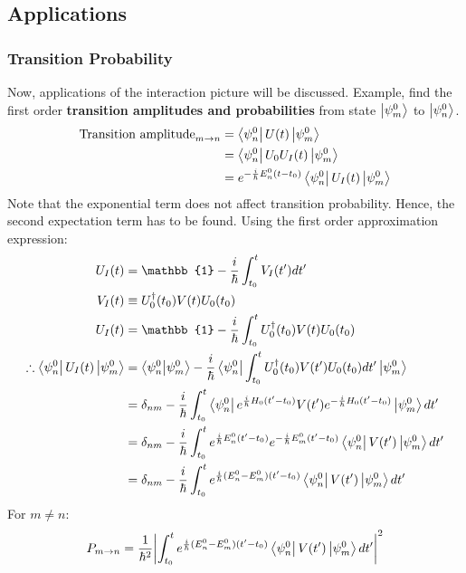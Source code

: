 \documentclass{article}
\begin{document}
\begin{flushleft}
\subsection{Applications}
\subsubsection{Transition Probability}
Now, applications of the interaction picture will be discussed. Example, find the first order \textbf{transition amplitudes and probabilities} from state $\ket{\psi_m^0}$ to $\ket{\psi_n^0}$.
\begin{align*}
    \text{Transition amplitude}_{m\rightarrow n}&=\bra{\psi_n^0}U(t)\ket{\psi_m^0}\\
    &=\bra{\psi_n^0}U_0U_I(t)\ket{\psi_m^0}\\
    &=e^{-\frac{i}{\hbar}E_n^0(t-t_0)}\bra{\psi_n^0}U_I(t)\ket{\psi_m^0}\\
    \end{align*}
Note that the exponential term does not affect transition probability. Hence, the second expectation term has to be found. Using the first order approximation expression:
\begin{align*}
     U_I(t)&=\mathbb{1}-\frac{i}{\hbar}\int_{t_0}^{t}V_I(t')dt'\\
     V_I(t)&\equiv U_0^\dagger(t_0) V(t)U_0(t_0)\\
     U_I(t)&=\mathbb{1}-\frac{i}{\hbar}\int_{t_0}^{t}U_0^\dagger(t_0) V(t)U_0(t_0)\\
     \therefore \bra{\psi_n^0}U_I(t)\ket{\psi_m^0}&=\bra{\psi_n^0}\ket{\psi_m^0}-\frac{i}{\hbar}\bra{\psi_n^0}\int_{t_0}^{t}U_0^\dagger(t_0) V(t')U_0(t_0)dt'\ket{\psi_m^0}\\
     &=\delta_{nm}-\frac{i}{\hbar}\int_{t_0}^{t}\bra{\psi_n^0}e^{\frac{i}{\hbar}H_0(t'-t_0)}V(t')e^{-\frac{i}{\hbar}H_0(t'-t_0)}\ket{\psi_m^0}dt'\\
     &=\delta_{nm}-\frac{i}{\hbar}\int_{t_0}^{t}e^{\frac{i}{\hbar}E_n^0(t'-t_0)}e^{-\frac{i}{\hbar}E_m^0(t'-t_0)}\bra{\psi_n^0}V(t')\ket{\psi_m^0}dt'\\
     &=\delta_{nm}-\frac{i}{\hbar}\int_{t_0}^{t}e^{\frac{i}{\hbar}(E_n^0-E_m^0)(t'-t_0)}\bra{\psi_n^0}V(t')\ket{\psi_m^0}dt'\\
     \end{align*}
For $m\neq n$:
\begin{equation}
     P_{m\rightarrow n}=\frac{1}{\hbar^2}\abs{\int_{t_0}^{t}e^{\frac{i}{\hbar}(E_n^0-E_m^0)(t'-t_0)}\bra{\psi_n^0}V(t')\ket{\psi_m^0}dt'}^2
\end{equation}
   


\end{flushleft}
\end{document}
